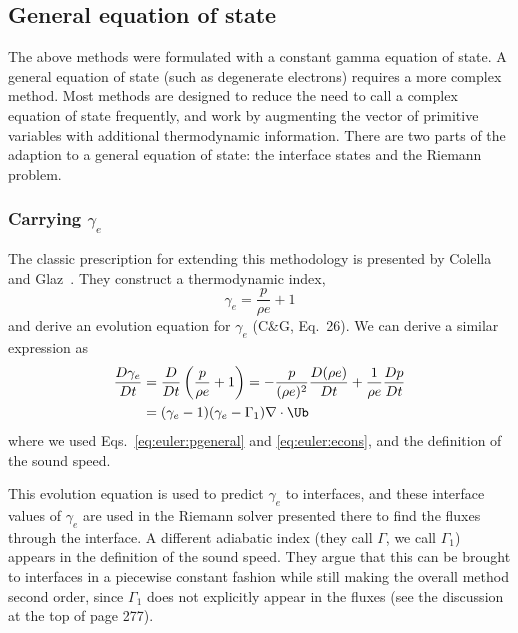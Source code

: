 \subsection{General equation of state}

The above methods were formulated with a constant gamma equation of
state.  A general equation of state (such as degenerate electrons)
requires a more complex method.  Most methods are designed to
reduce the need to call a complex equation of state frequently,
and work by augmenting the vector of primitive variables with
additional thermodynamic information.  There are two parts of the
adaption to a general equation of state: the interface states and
the Riemann problem.

\subsubsection{Carrying $\gamma_e$}


The classic prescription for
extending this methodology is presented by Colella and
Glaz~\cite{colellaglaz:1985}.  They construct a thermodynamic index,
\begin{equation}
\gamma_e = \frac{p}{\rho e} + 1
\end{equation}
and derive an evolution equation for $\gamma_e$ (C\&G, Eq.\ 26).
We can derive a similar expression as
\begin{align}
\frac{D\gamma_e}{Dt} &= \frac{D}{Dt} \left ( \frac{p}{\rho e} + 1 \right )
   = - \frac{p}{(\rho e)^2} \frac{D(\rho e)}{Dt} + \frac{1}{\rho e} \frac{Dp}{Dt} \nonumber \\
   &= (\gamma_e - 1) (\gamma_e  - \Gamma_1) \nabla \cdot \Ub \label{eq:gammae}
\end{align}
where we used Eqs.~\ref{eq:euler:pgeneral} and \ref{eq:euler:econs}, and the definition
of the sound speed.

This evolution equation is used to predict $\gamma_e$ to interfaces,
and these interface values of $\gamma_e$ are used in the Riemann
solver presented there to find the fluxes through the interface.  A
different adiabatic index (they call $\Gamma$, we call $\Gamma_1$)
appears in the definition of the sound speed.  They argue that this
can be brought to interfaces in a piecewise constant fashion while
still making the overall method second order, since $\Gamma_1$ does
not explicitly appear in the fluxes (see the discussion at the top of
page 277).

